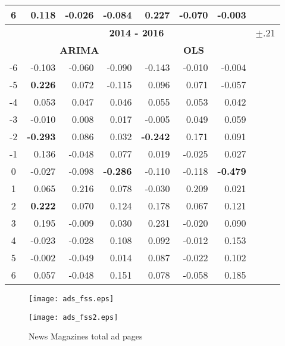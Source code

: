 \documentclass[10pt,a4paper]{scrreprt}
\begin{document}
\begin{table}[htbp]
\begin{tabular}{crrr|rrrr}
    6     & 0.118 & -0.026 & -0.084 & 0.227 & -0.070 & -0.003 &  \\
    \midrule
    \multicolumn{1}{|r}{} & \multicolumn{6}{c}{\textbf{2014 - 2016}}      & \multicolumn{1}{c}{$\pm$.21} \\
    \midrule
          & \multicolumn{3}{c|}{\textbf{ARIMA}} & \multicolumn{3}{c}{\textbf{OLS}} &  \\
    -6    & -0.103 & -0.060 & -0.090 & -0.143 & -0.010 & -0.004 &  \\
    -5    & \textbf{0.226} & 0.072 & -0.115 & 0.096 & 0.071 & -0.057 &  \\
    -4    & 0.053 & 0.047 & 0.046 & 0.055 & 0.053 & 0.042 &  \\
    -3    & -0.010 & 0.008 & 0.017 & -0.005 & 0.049 & 0.059 &  \\
    -2    & \textbf{-0.293} & 0.086 & 0.032 & \textbf{-0.242} & 0.171 & 0.091 &  \\
    -1    & 0.136 & -0.048 & 0.077 & 0.019 & -0.025 & 0.027 &  \\
    0     & -0.027 & -0.098 & \textbf{-0.286} & -0.110 & -0.118 & \textbf{-0.479} &  \\
    1     & 0.065 & 0.216 & 0.078 & -0.030 & 0.209 & 0.021 &  \\
    2     & \textbf{0.222} & 0.070 & 0.124 & 0.178 & 0.067 & 0.121 &  \\
    3     & 0.195 & -0.009 & 0.030 & 0.231 & -0.020 & 0.090 &  \\
    4     & -0.023 & -0.028 & 0.108 & 0.092 & -0.012 & 0.153 &  \\
    5     & -0.002 & -0.049 & 0.014 & 0.087 & -0.022 & 0.102 &  \\
    6     & 0.057 & -0.048 & 0.151 & 0.078 & -0.058 & 0.185 &  \\
    \bottomrule
    \bottomrule
    \end{tabular}%
  \label{tab:ccf_fss}%
\end{table}%

\begin{figure}[H]
\caption{News Magazines total ad pages}
\begin{minipage}[hbt]{7cm}
	\centering
	\texttt{[image: ads\_fss.eps]}
\end{minipage}
\hfill
\begin{minipage}[hbt]{7cm}
	\centering
	\texttt{[image: ads\_fss2.eps]}
\end{minipage}
\label{fig:fss2}
\end{figure}
\end{document}
